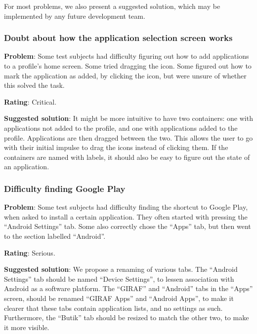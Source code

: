 For most problems, we also present a suggested solution, which may be implemented by any future development team.

\subsubsection{Doubt about how the application selection screen works}
\begin{description}
\item{\textbf{Problem}:} Some test subjects had difficulty figuring out how to add applications to a profile's home screen. 
Some tried dragging the icon. 
Some figured out how to mark the application as added, by clicking the icon, but were unsure of whether this solved the task.
\item{\textbf{Rating}:} Critical.
\item{\textbf{Suggested solution}:} It might be more intuitive to have two containers: one with applications not added to the profile, and one with applications added to the profile. 
Applications are then dragged between the two. 
This allows the user to go with their initial impulse to drag the icons instead of clicking them. 
If the containers are named with labels, it should also be easy to figure out the state of an application.
\end{description}


\subsubsection{Difficulty finding Google Play}
\begin{description}
\item{\textbf{Problem}:} Some test subjects had difficulty finding the shortcut to Google Play, when asked to install a certain application. 
They often started with pressing the ``Android Settings'' tab.
Some also correctly chose the ``Apps'' tab, but then went to the section labelled ``Android''. 
\item{\textbf{Rating}:} Serious.
\item{\textbf{Suggested solution}:} We propose a renaming of various tabs. 
The ``Android Settings'' tab should be named ``Device Settings'', to lessen association with Android as a software platform.
The ``GIRAF'' and ``Android'' tabs in the ``Apps'' screen, should be renamed ``GIRAF Apps'' and ``Android Apps'', to make it clearer that these tabs contain application lists, and no settings as such. 
Furthermore, the ``Butik'' tab should be resized to match the other two, to make it more visible.
\end{description}

